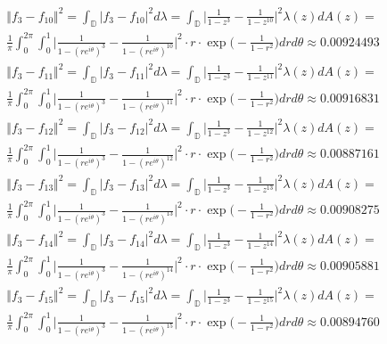 \documentclass[12pt]{article}
\begin{document}
\begin{align}
& \Vert f_3 - f_{10} \Vert^2 = \int_\mathbb{D} \vert f_3 - f_{10} \vert^2 d\lambda = \int_\mathbb{D} \bigg\vert \frac{1}{1-z^3} - \frac{1}{1-z^{10}} \bigg\vert^2 \lambda(z) dA(z) = \\
& \frac{1}{\pi} \int_0^{2\pi} \int_0^1 \bigg \vert \frac{1}{1-(re^{i\theta})^3} - \frac{1}{1-(re^{i\theta})^{10}} \bigg \vert^2 \cdot r \cdot \exp\bigg(-\frac{1}{1-r^2}\bigg)dr d\theta \approx 0.00924493 \\
& \Vert f_3 - f_{11} \Vert^2 = \int_\mathbb{D} \vert f_3 - f_{11} \vert^2 d\lambda = \int_\mathbb{D} \bigg\vert \frac{1}{1-z^3} - \frac{1}{1-z^{11}} \bigg\vert^2 \lambda(z) dA(z) = \\
& \frac{1}{\pi} \int_0^{2\pi} \int_0^1 \bigg \vert \frac{1}{1-(re^{i\theta})^3} - \frac{1}{1-(re^{i\theta})^{11}} \bigg \vert^2 \cdot r \cdot \exp\bigg(-\frac{1}{1-r^2}\bigg)dr d\theta \approx 0.00916831 \\
& \Vert f_3 - f_{12} \Vert^2 = \int_\mathbb{D} \vert f_3 - f_{12} \vert^2 d\lambda = \int_\mathbb{D} \bigg\vert \frac{1}{1-z^3} - \frac{1}{1-z^{12}} \bigg\vert^2 \lambda(z) dA(z) = \\
& \frac{1}{\pi} \int_0^{2\pi} \int_0^1 \bigg \vert \frac{1}{1-(re^{i\theta})^3} - \frac{1}{1-(re^{i\theta})^{12}} \bigg \vert^2 \cdot r \cdot \exp\bigg(-\frac{1}{1-r^2}\bigg)dr d\theta \approx 0.00887161 \\
& \Vert f_3 - f_{13} \Vert^2 = \int_\mathbb{D} \vert f_3 - f_{13} \vert^2 d\lambda = \int_\mathbb{D} \bigg\vert \frac{1}{1-z^3} - \frac{1}{1-z^{13}} \bigg\vert^2 \lambda(z) dA(z) = \\
& \frac{1}{\pi} \int_0^{2\pi} \int_0^1 \bigg \vert \frac{1}{1-(re^{i\theta})^3} - \frac{1}{1-(re^{i\theta})^{13}} \bigg \vert^2 \cdot r \cdot \exp\bigg(-\frac{1}{1-r^2}\bigg)dr d\theta \approx 0.00908275 \\
& \Vert f_3 - f_{14} \Vert^2 = \int_\mathbb{D} \vert f_3 - f_{14} \vert^2 d\lambda = \int_\mathbb{D} \bigg\vert \frac{1}{1-z^3} - \frac{1}{1-z^{14}} \bigg\vert^2 \lambda(z) dA(z) = \\
& \frac{1}{\pi} \int_0^{2\pi} \int_0^1 \bigg \vert \frac{1}{1-(re^{i\theta})^3} - \frac{1}{1-(re^{i\theta})^{14}} \bigg \vert^2 \cdot r \cdot \exp\bigg(-\frac{1}{1-r^2}\bigg)dr d\theta \approx 0.00905881 \\
& \Vert f_3 - f_{15} \Vert^2 = \int_\mathbb{D} \vert f_3 - f_{15} \vert^2 d\lambda = \int_\mathbb{D} \bigg\vert \frac{1}{1-z^3} - \frac{1}{1-z^{15}} \bigg\vert^2 \lambda(z) dA(z) = \\
& \frac{1}{\pi} \int_0^{2\pi} \int_0^1 \bigg \vert \frac{1}{1-(re^{i\theta})^3} - \frac{1}{1-(re^{i\theta})^{15}} \bigg \vert^2 \cdot r \cdot \exp\bigg(-\frac{1}{1-r^2}\bigg)dr d\theta \approx 0.00894760 \\

\end{align}
\end{document}
